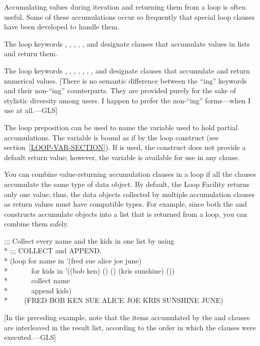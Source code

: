 Accumulating values during iteration and returning them from a loop
is often useful.  Some of these accumulations occur so
frequently that special loop clauses have been developed to handle them.

The loop keywords , ,
, ,
, and 
designate clauses that
accumulate values in lists and return them.

The loop keywords , ,
, ,
, ,
, and 
designate clauses that accumulate and
return numerical values.
[There is no semantic difference between the ``ing'' keywords and their non-``ing''
counterparts.  They are provided purely for the sake of stylistic diversity among users.
I happen to prefer the non-``ing'' forms---when I use  at all.---GLS]

The loop preposition  can be used to name the 
variable used to hold partial accumulations.
The variable is bound as if by the loop
construct  (see section~\ref{LOOP-VAR-SECTION}).  If 
 is used, the construct does not provide a default return value;
however, the variable is available
for use in any  clause.

You can combine value-returning accumulation clauses in a loop if
all the clauses accumulate the same type of data object.  
By default, the Loop Facility returns only one value;
thus, the data objects collected by multiple accumulation clauses 
as return values must have compatible types. For example, since both
the  and  constructs accumulate objects into a
list that is returned from a loop, you can combine them safely.


\begin{lisp}
;;; Collect every name and the kids in one list by using \\*
;;; COLLECT and APPEND. \\*
(loop for name in '(fred sue alice joe june) \\*
~~~~~~for kids in '((bob ken) () () (kris sunshine) ()) \\*
~~~~~~collect name \\*
~~~~~~append kids) \\*
~~~\EV~(FRED BOB KEN SUE ALICE JOE KRIS SUNSHINE JUNE)
\end{lisp}
[In the preceding example, note that the items accumulated by the
 and  clauses are interleaved in the result list, according to
the order in which the clauses were executed.---GLS]


